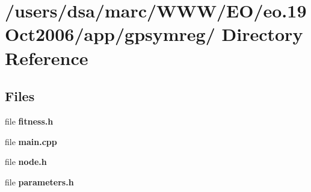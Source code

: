 \section{/users/dsa/marc/WWW/EO/eo.19Oct2006/app/gpsymreg/ Directory Reference}
\label{dir_000021}
\subsection*{Files}
\begin{CompactItemize}
\item 
file {\bf fitness.h}
\item 
file {\bf main.cpp}
\item 
file {\bf node.h}
\item 
file {\bf parameters.h}
\end{CompactItemize}
